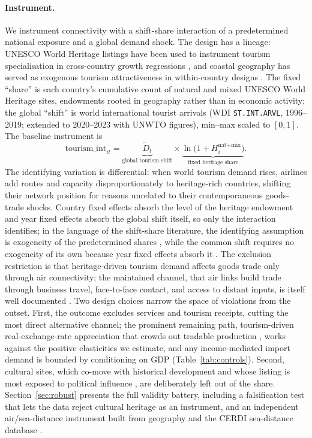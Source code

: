 \paragraph{Instrument.} We instrument connectivity with a shift-share
interaction of a predetermined national exposure and a global demand shock.
The design has a lineage: UNESCO World Heritage listings have been used to
instrument tourism specialisation in cross-country growth regressions
\citep{Arezki_2009}, and coastal geography has served as exogenous tourism
attractiveness in within-country designs \citep{Faber_2019}. The fixed
``share'' is each country's cumulative count of natural and mixed
UNESCO World Heritage sites, endowments rooted in geography rather than in
economic activity; the global ``shift'' is world international tourist
arrivals (WDI \texttt{ST.INT.ARVL}, 1996--2019; extended to 2020--2023 with
UNWTO figures), min--max scaled to $[0,1]$. The baseline instrument is
\begin{equation}
\text{tourism\_int}_{it}
= \underbrace{\widetilde{D}_t}_{\text{global tourism shift}}
\times \underbrace{\ln\!\bigl(1+H_i^{\text{nat+mix}}\bigr)}_{\text{fixed heritage share}}.
\label{eq:instr}
\end{equation}
The identifying variation is differential: when world tourism demand rises,
airlines add routes and capacity disproportionately to heritage-rich
countries, shifting their network position for reasons unrelated to their
contemporaneous goods-trade shocks. Country fixed effects absorb the level
of the heritage endowment and year fixed effects absorb the global shift
itself, so only the interaction identifies; in the language of the
shift-share literature, the identifying assumption is exogeneity of the
predetermined shares \citep{GoldsmithPinkham_2020}, while the common shift
requires no exogeneity of its own because year fixed effects absorb it
\citep{Borusyak_2022}. The exclusion restriction is that heritage-driven
tourism demand affects goods trade only through air connectivity; the
maintained channel, that air links build trade through business travel,
face-to-face contact, and access to distant inputs, is itself well
documented \citep{Campante_2017,Feyrer_2019}. Two design choices narrow the
space of violations from the outset. First, the outcome excludes services
and tourism receipts, cutting the most direct alternative channel; the
prominent remaining path, tourism-driven real-exchange-rate appreciation
that crowds out tradable production \citep{Copeland_1991,Holzner_2011},
works against the positive elasticities we estimate, and any
income-mediated import demand is bounded by conditioning on GDP
(Table~\ref{tab:controls}). Second, cultural sites, which co-move with
historical development and whose listing is most exposed to political
influence \citep{Bertacchini_2016}, are deliberately left out of the share.
Section~\ref{sec:robust} presents the full validity battery, including a
falsification test that lets the data reject cultural heritage as an
instrument, and an independent air/sea-distance instrument built from
geography and the CERDI sea-distance database \citep{Bertoli_2016}.

